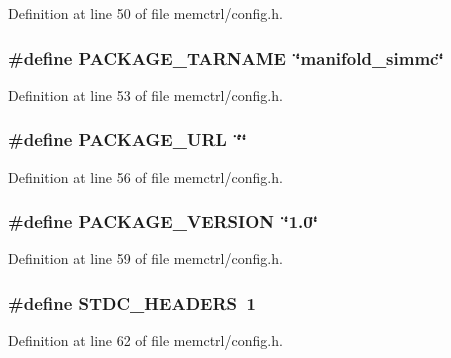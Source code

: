 Definition at line 50 of file memctrl/config.h.
\subsubsection[{PACKAGE\_\-TARNAME}]{\setlength{\rightskip}{0pt plus 5cm}\#define PACKAGE\_\-TARNAME~\char`\"{}manifold\_\-simmc\char`\"{}}\label{memctrl_2config_8h_f415af6bfede0e8d5453708afe68651c}




Definition at line 53 of file memctrl/config.h.
\subsubsection[{PACKAGE\_\-URL}]{\setlength{\rightskip}{0pt plus 5cm}\#define PACKAGE\_\-URL~\char`\"{}\char`\"{}}\label{memctrl_2config_8h_5c93853116d5a50307b6744f147840aa}




Definition at line 56 of file memctrl/config.h.
\subsubsection[{PACKAGE\_\-VERSION}]{\setlength{\rightskip}{0pt plus 5cm}\#define PACKAGE\_\-VERSION~\char`\"{}1.0\char`\"{}}\label{memctrl_2config_8h_a326a05d5e30f9e9a4bb0b4469d5d0c0}




Definition at line 59 of file memctrl/config.h.
\subsubsection[{STDC\_\-HEADERS}]{\setlength{\rightskip}{0pt plus 5cm}\#define STDC\_\-HEADERS~1}\label{memctrl_2config_8h_550e5c272cc3cf3814651721167dcd23}




Definition at line 62 of file memctrl/config.h.